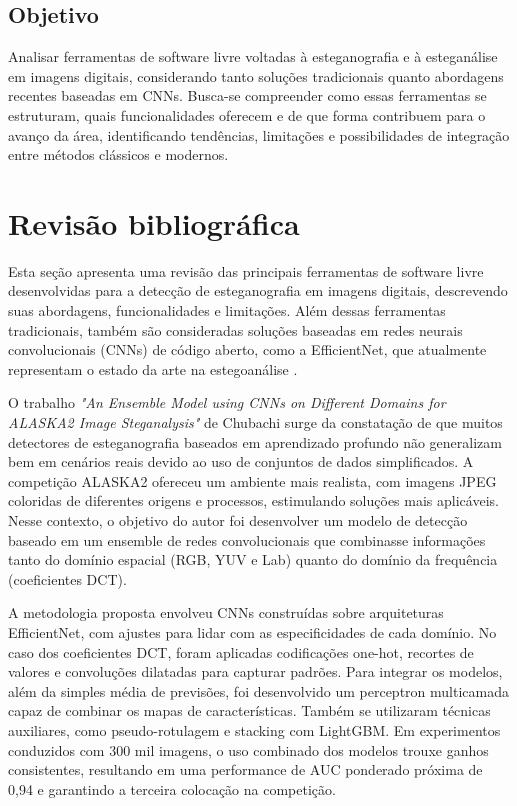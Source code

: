 \documentclass[12pt]{article}
\begin{document}
\subsection{Objetivo}

Analisar ferramentas de software livre voltadas à esteganografia e à
esteganálise em imagens digitais, considerando tanto soluções tradicionais
quanto abordagens recentes baseadas em CNNs. Busca-se compreender como essas
ferramentas se estruturam, quais funcionalidades oferecem e de que forma
contribuem para o avanço da área, identificando tendências, limitações e
possibilidades de integração entre métodos clássicos e modernos.

\section{Revisão bibliográfica} \label{sec:firstpage}
Esta seção apresenta uma revisão das principais ferramentas de software livre
desenvolvidas para a detecção de esteganografia em imagens digitais,
descrevendo suas abordagens, funcionalidades e limitações. Além dessas
ferramentas tradicionais, também são consideradas soluções baseadas em redes
neurais convolucionais (CNNs) de código aberto, como a EfficientNet, que
atualmente representam o estado da arte na estegoanálise
\cite{LaCroix2024survey}.


O trabalho \textit{"An Ensemble Model using CNNs on Different Domains for
  ALASKA2 Image Steganalysis"} de Chubachi \cite{chubachi2020cnn} surge da
constatação de que muitos detectores de esteganografia baseados em aprendizado
profundo não generalizam bem em cenários reais devido ao uso de conjuntos de
dados simplificados. A competição ALASKA2 ofereceu um ambiente mais realista,
com imagens JPEG coloridas de diferentes origens e processos, estimulando
soluções mais aplicáveis. Nesse contexto, o objetivo do autor foi desenvolver
um modelo de detecção baseado em um ensemble de redes convolucionais que
combinasse informações tanto do domínio espacial (RGB, YUV e Lab) quanto do
domínio da frequência (coeficientes DCT).

A metodologia proposta envolveu CNNs construídas sobre arquiteturas
EfficientNet, com ajustes para lidar com as especificidades de cada domínio. No
caso dos coeficientes DCT, foram aplicadas codificações one-hot, recortes de
valores e convoluções dilatadas para capturar padrões. Para integrar os
modelos, além da simples média de previsões, foi desenvolvido um perceptron
multicamada capaz de combinar os mapas de características. Também se utilizaram
técnicas auxiliares, como pseudo-rotulagem e stacking com LightGBM. Em
experimentos conduzidos com 300 mil imagens, o uso combinado dos modelos trouxe
ganhos consistentes, resultando em uma performance de AUC ponderado próxima de
0,94 e garantindo a terceira colocação na competição.
\end{document}
